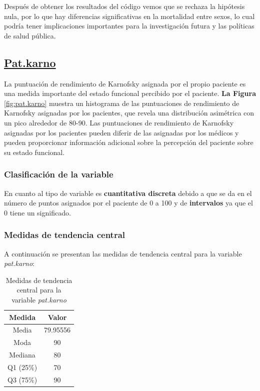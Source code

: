 \documentclass[a4paper,12pt]{article}
\begin{document}
    Después de obtener los resultados del código vemos que se rechaza la hipótesis nula, por lo que hay diferencias significativas en la mortalidad entre sexos, lo cual podría tener implicaciones importantes para la investigación futura y las políticas de salud pública.

    \subsection*{\underline{Pat.karno}}

    La puntuación de rendimiento de Karnofsky asignada por el propio paciente es una medida importante del estado funcional percibido por el paciente. \textbf{La Figura }\ref{fig:pat.karno} muestra un histograma de las puntuaciones de rendimiento de Karnofsky asignadas por los pacientes, que revela una distribución asimétrica con un pico alrededor de 80-90. Las puntuaciones de rendimiento de Karnofsky asignadas por los pacientes pueden diferir de las asignadas por los médicos y pueden proporcionar información adicional sobre la percepción del paciente sobre su estado funcional.

    \subsubsection*{Clasificación de la variable}

    En cuanto al tipo de variable es \textbf{cuantitativa discreta} debido a que se da en el número de puntos asignados por el paciente de 0 a 100 y de \textbf{intervalos} ya que el 0 tiene un significado.

    \subsubsection*{Medidas de tendencia central}

    A continuación se presentan las medidas de tendencia central para la variable \textit{pat.karno}:
    
    \begin{table}[h!]
        \centering
        \begin{tabular}{|c|c|}
            \hline
            \textbf{Medida} & \textbf{Valor} \\
            \hline
            Media & 79.95556 \\
            \hline
            Moda & 90 \\
            \hline
            Mediana & 80 \\
            \hline
            Q1 (25\%) & 70 \\
            \hline
            Q3 (75\%) & 90 \\
            \hline
        \end{tabular}
        \caption{Medidas de tendencia central para la variable \textit{pat.karno}}
        \label{tab:medidas_tendencia_central_pat_karno}
    \end{table}
\end{document}
